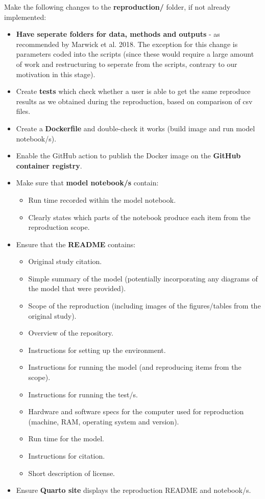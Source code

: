 Make the following changes to the \textbf{reproduction/} folder, if not already implemented:
\begin{itemize}
    \item \textbf{Have seperate folders for data, methods and outputs} - as recommended by Marwick et al. 2018\autocite{marwick_packaging_2018}. The exception for this change is parameters coded into the scripts (since these would require a large amount of work and restructuring to seperate from the scripts, contrary to our motivation in this stage).
    \item Create \textbf{tests} which check whether a user is able to get the same reproduce results as we obtained during the reproduction, based on comparison of csv files.
    \item Create a \textbf{Dockerfile} and double-check it works (build image and run model notebook/s).
    \item Enable the GitHub action to publish the Docker image on the \textbf{GitHub container registry}.
    \item Make sure that \textbf{model notebook/s} contain:
    \begin{itemize}
        \item Run time recorded within the model notebook.
        \item Clearly states which parts of the notebook produce each item from the reproduction scope.
    \end{itemize}
    \item Ensure that the \textbf{README} contains:
    \begin{itemize}
        \item Original study citation.
        \item Simple summary of the model (potentially incorporating any diagrams of the model that were provided).
        \item Scope of the reproduction (including images of the figures/tables from the original study).
        \item Overview of the repository.
        \item Instructions for setting up the environment.
        \item Instructions for running the model (and reproducing items from the scope).
        \item Instructions for running the test/s.
        \item Hardware and software specs for the computer used for reproduction (machine, RAM, operating system and version).
        \item Run time for the model.
        \item Instructions for citation.
        \item Short description of license.
    \end{itemize}
    \item Ensure \textbf{Quarto site} displays the reproduction README and notebook/s.
\end{itemize}

